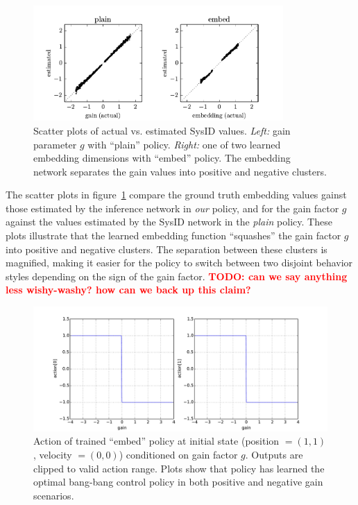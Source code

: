 \documentclass{article}
\newcommand{\TODO}[1]{\textcolor{red}{\textbf{TODO: #1}}}
\begin{document}
\begin{figure}
\centering
\includegraphics[width=0.85\textwidth]{pointmass_embed_scatter.pdf}
\caption{Scatter plots of actual vs. estimated SysID values.
\emph{Left:} gain parameter $g$ with ``plain'' policy.
\emph{Right:} one of two learned embedding dimensions with ``embed'' policy.
The embedding network separates the gain values into positive and negative clusters.
}
\label{fig:scatter}
\end{figure}
The scatter plots in figure~\ref{fig:scatter} compare the ground truth embedding values gainst those estimated by the inference network in \emph{our} policy, and for the gain factor $g$ against the values estimated by the SysID network in the \emph{plain} policy.
These plots illustrate that the learned embedding function ``squashes'' the gain factor $g$ into positive and negative clusters.
The separation between these clusters is magnified, making it easier for the policy to switch between two disjoint behavior styles depending on the sign of the gain factor.
\TODO{can we say anything less wishy-washy? how can we back up this claim?}

\begin{figure}
\centering
\includegraphics[width=\textwidth]{pointmass_conditional_action.pdf}
\caption{
Action of trained ``embed'' policy at initial state (position $ = (1,1)$, velocity $=(0,0)$) conditioned on gain factor $g$.
Outputs are clipped to valid action range.
Plots show that policy has learned the optimal bang-bang control policy in both positive and negative gain scenarios.
}
\label{fig:conditional_action}
\end{figure}
\end{document}
